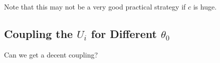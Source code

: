 \documentclass{article}
\theoremstyle{definition}
\begin{document}
Note that this may not be a very good practical strategy if $c$ is huge.

\subsection{Coupling the $U_i$ for Different $\theta_0$}

Can we get a decent coupling?





\end{document}
